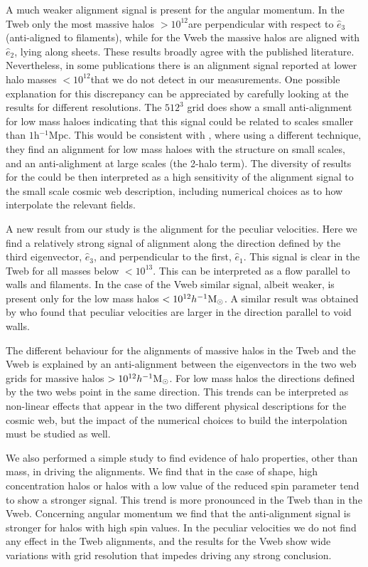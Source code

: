 \documentclass[useAMS,usenatbib]{mn2e}
\newcommand{\hMsun}{{\ifmmode{h^{-1}{\rm
        {M_{\odot}}}}\else{$h^{-1}{\rm{M_{\odot}}}$~}\fi}}
\begin{document}
A much weaker alignment signal is present for the angular momentum. In
the Tweb only the most massive halos $>10^{12}$\hMsun are
perpendicular with respect to $\hat{e}_3$ (anti-aligned to filaments),
while for the Vweb the massive halos are aligned with $\hat{e}_2$,
lying along sheets. These results broadly agree with the
published literature. Nevertheless, in some publications
\citep{AragonCalvo2007,Hahn2007,AragonCalvo2014} there is an alignment signal
reported at lower halo masses $<10^{12}$\hMsun that we do not detect
in our measurements.  One possible explanation for this discrepancy
can be appreciated by carefully looking at the results for different
resolutions.  The $512^3$ grid does show a small anti-alignment for low
mass haloes indicating that this signal could be related to scales
smaller than $1$h$^{-1}$Mpc.  This would be consistent with
\citep{Paz2008}, where using a different technique, they find an
alignment for low mass haloes with the structure on small scales, and
an anti-alighment at large scales (the 2-halo term). The diversity of
results for the could be then interpreted as a high sensitivity of the
alignment signal to the small scale cosmic web description, including
numerical choices as to how interpolate the relevant fields.


A new result from our study is the alignment for the peculiar
velocities. Here we find a relatively strong signal of alignment along
the direction defined by the third eigenvector, $\hat{e}_3$, and
perpendicular to the first, $\hat{e}_1$. This signal is clear in the
Tweb for all masses below $<10^{13}$\hMsun. This can be interpreted as
a flow parallel to walls and filaments. In the case of the Vweb
similar signal, albeit weaker, is present only for the low mass halos
$<10^{12}\hMsun$. A similar result was obtained by \citep{Padilla2005}
who found that peculiar velocities are larger in the direction
parallel to void walls. 

The different behaviour for the alignments of massive halos in the
Tweb and the Vweb is explained by an anti-alignment between the
eigenvectors in the two web grids for massive halos
$>10^{12}\hMsun$. For low mass halos the directions defined by the two
webs point in the same direction. This trends can be interpreted as
non-linear effects that appear in the two different physical
descriptions for the cosmic web, but the impact of the numerical
choices to build the interpolation must be studied as well.

We also performed a simple study to find evidence of halo properties,
other than mass, in driving the alignments. We find that in the case of
shape, high concentration halos or halos with a low value of
the reduced spin parameter tend to show a stronger signal. This trend is
more pronounced in the Tweb than in the Vweb. Concerning angular
momentum we find that the anti-alignment signal is stronger for halos
with high spin values. In the peculiar velocities we do not find any
effect in the Tweb alignments, and the results for the Vweb show 
wide variations with grid resolution that impedes driving any strong
conclusion.
\end{document}
